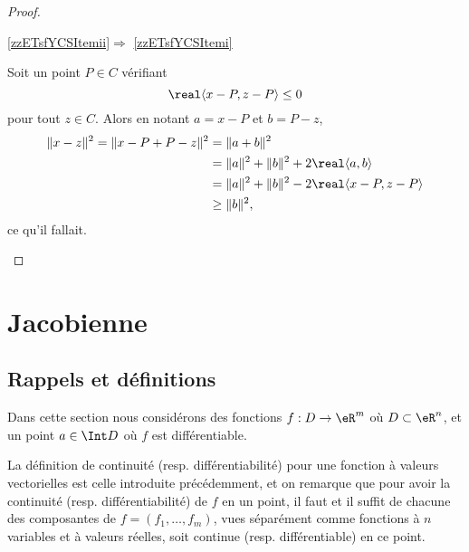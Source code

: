 \begin{proof}
\begin{subproof}
        \item[\ref{zzETsfYCSItemii}\( \Rightarrow\) \ref{zzETsfYCSItemi}]

            Soit un point \( P\in C\) vérifiant 
            \begin{equation}
                \real\langle x-P, z-P\rangle \leq 0
            \end{equation}
            pour tout \( z\in C\). Alors en notant \( a=x-P\) et \( b=P-z\),
            \begin{equation}
                \begin{aligned}[]
                \| x-z \|^2=\| x-P+P-z \|^2&=\| a+b \|^2\\
                &=\| a \|^2+\| b \|^2+2\real\langle a, b\rangle \\
                &=\| a \|^2+\| b \|^2-2\real\langle x-P, z-P\rangle \\
                &\geq \| b \|^2,
                \end{aligned}
            \end{equation}
            ce qu'il fallait.
    \end{subproof}
\end{proof}

\section{Jacobienne}

\subsection{Rappels et définitions}

Dans cette section nous considérons des fonctions $f : D \to \eR^m$
où $D \subset \eR^n$, et un point $a \in \Int D$ où $f$ est
différentiable.
\begin{remark}
  La définition de continuité (resp. différentiabilité) pour une
  fonction à valeurs vectorielles est celle introduite précédemment,
  et on remarque que pour avoir la continuité
  (resp. différentiabilité) de $f$ en un point, il faut et il suffit
  de chacune des composantes de $f = (f_1,\ldots, f_m)$, vues
  séparément comme fonctions à $n$ variables et à valeurs réelles,
  soit continue (resp. différentiable) en ce point.
\end{remark}

